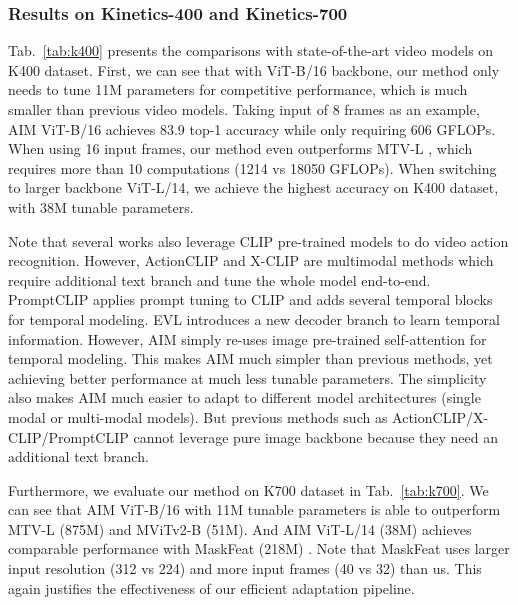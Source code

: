\documentclass{article} \usepackage{iclr2023_conference,times}
\begin{document}
	\subsubsection{Results on Kinetics-400 and Kinetics-700}
	\label{subsubsec:k400_results}


	
	Tab.\ \ref{tab:k400} presents the comparisons with state-of-the-art video models on K400 dataset. 
	First, we can see that with ViT-B/16 backbone, our method only needs to tune 11M parameters for competitive performance, which is much smaller than previous video models. 
Taking input of 8 frames as an example, AIM ViT-B/16 achieves 83.9 top-1 accuracy while only requiring 606 GFLOPs. 
	When using 16 input frames, our method even outperforms MTV-L \citep{yan2022multiview}, which requires more than 10 computations (1214 vs 18050 GFLOPs).
When switching to larger backbone ViT-L/14, we achieve the highest accuracy  on K400 dataset, with 38M tunable parameters. 
	
Note that several works also leverage CLIP pre-trained models to do video action recognition.
	However, ActionCLIP \citep{wang2021actionclip} and X-CLIP \citep{xclip} are multimodal methods which require additional text branch and tune the whole model end-to-end. PromptCLIP \citep{promptclip} applies prompt tuning \citep{prompttuning} to CLIP  and adds several temporal blocks for temporal modeling.
EVL \citep{frozenclip} introduces a new decoder branch to learn temporal information. However, AIM simply re-uses image pre-trained self-attention for temporal modeling. This makes AIM much simpler than previous methods, yet achieving better performance at much less tunable parameters. The simplicity also makes AIM much easier to adapt to different model architectures (single modal or multi-modal models). But previous methods such as ActionCLIP/X-CLIP/PromptCLIP cannot leverage pure image backbone because they need an additional text branch.


	Furthermore, we evaluate our method on K700 dataset in Tab.~\ref{tab:k700}. We can see that AIM ViT-B/16 with 11M tunable parameters is able to outperform MTV-L (875M) and MViTv2-B (51M). And AIM ViT-L/14 (38M) achieves comparable performance with MaskFeat (218M) \citep{maskfeat}. Note that MaskFeat uses larger input resolution (312 vs 224) and more input frames (40 vs 32) than us.
	This again justifies the effectiveness of our efficient adaptation pipeline. 


	
	
\end{document}
